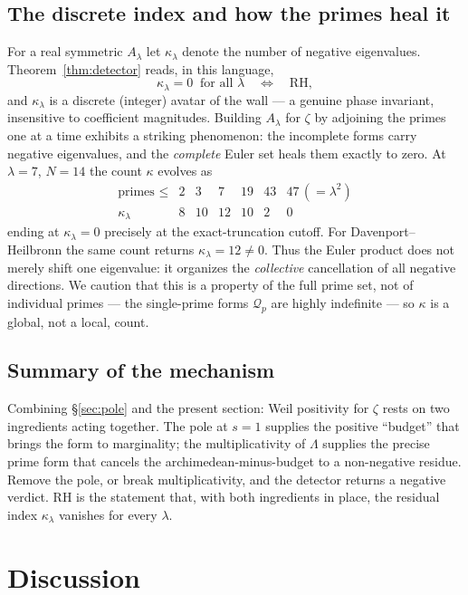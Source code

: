\documentclass[11pt]{amsart}
\theoremstyle{definition}
\theoremstyle{remark}
\newcommand{\lam}{\lambda}
\begin{document}
\subsection{The discrete index and how the primes heal it}
For a real symmetric $A_\lam$ let $\kappa_\lam$ denote the number of negative eigenvalues. Theorem~\ref{thm:detector} reads, in this language,
\[
\kappa_\lam=0\ \text{ for all }\lam\quad\Longleftrightarrow\quad\text{RH},
\]
and $\kappa_\lam$ is a discrete (integer) avatar of the wall --- a genuine phase invariant, insensitive to coefficient magnitudes. Building $A_\lam$ for $\zeta$ by adjoining the primes one at a time exhibits a striking phenomenon: the incomplete forms carry negative eigenvalues, and the \emph{complete} Euler set heals them exactly to zero. At $\lam=7$, $N=14$ the count $\kappa$ evolves as
\[
\begin{array}{c|cccccc}
\text{primes }\le & 2 & 3 & 7 & 19 & 43 & 47\,(=\lam^2)\\\hline
\kappa_\lam & 8 & 10 & 12 & 10 & 2 & 0
\end{array}
\]
ending at $\kappa_\lam=0$ precisely at the exact-truncation cutoff. For Davenport--Heilbronn the same count returns $\kappa_\lam=12\ne 0$. Thus the Euler product does not merely shift one eigenvalue: it organizes the \emph{collective} cancellation of all negative directions. We caution that this is a property of the full prime set, not of individual primes --- the single-prime forms $\mathcal Q_p$ are highly indefinite --- so $\kappa$ is a global, not a local, count.

\subsection{Summary of the mechanism}
Combining \S\ref{sec:pole} and the present section: Weil positivity for $\zeta$ rests on two ingredients acting together. The pole at $s=1$ supplies the positive ``budget'' that brings the form to marginality; the multiplicativity of $\Lambda$ supplies the precise prime form that cancels the archimedean-minus-budget to a non-negative residue. Remove the pole, or break multiplicativity, and the detector returns a negative verdict. RH is the statement that, with both ingredients in place, the residual index $\kappa_\lam$ vanishes for every $\lam$.

\section{Discussion}\label{sec:discussion}
\end{document}
